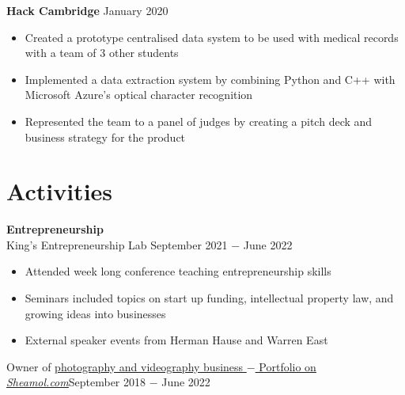 \documentclass{article}
\begin{document}
\textbf{Hack Cambridge} \hfill January 2020
\begin{itemize}
    \item Created a prototype centralised data system to be used with medical records with a team of 3 other students
    \item Implemented a data extraction system by combining Python and C++ with Microsoft Azure’s optical character recognition 
    \item Represented the team to a panel of judges by creating a pitch deck and business strategy for the product
\end{itemize} \medskip



\vspace{-0.75\baselineskip}
\hrulefill
\vspace{-0.75\baselineskip}

\clearpage
\section*{Activities}

\textbf{Entrepreneurship}\\
King's Entrepreneurship Lab \hfill September 2021 $-$ June 2022
\begin{itemize}
    \item Attended week long conference teaching entrepreneurship skills
    \item Seminars included topics on start up funding, intellectual property law, and growing ideas into businesses
    \item External speaker events from Herman Hause and Warren East 
\end{itemize}
Owner of \href{www.sheamol.com}{photography and videography business $-$ Portfolio on \underline{\textit{Sheamol.com}}}\hfill September 2018 $-$ June 2022\medskip
\end{document}
